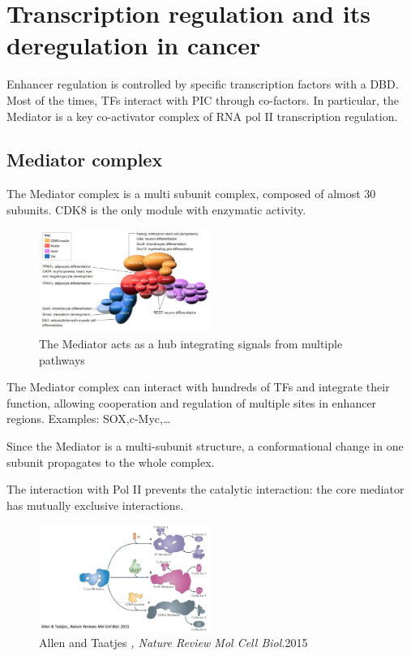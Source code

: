\graphicspath{{chapters/_resources/}}

\chapter{Transcription regulation and its deregulation in cancer}

Enhancer regulation is controlled by specific transcription factors with a DBD. Most of the times, TFs interact with PIC through co-factors. In particular, the Mediator is a key co-activator complex of RNA pol II transcription regulation.

\hypertarget{mediator-complex}{%
\section{Mediator complex}\label{mediator-complex}}

The Mediator complex is a multi subunit complex, composed of almost 30 subunits. CDK8 is the only module with enzymatic activity.

\begin{figure}
\centering
\includegraphics[width=0.5\textwidth]{../_resources/Screenshot_2022-10-07_at_10-47-50.png}
\caption{The Mediator acts as a hub integrating signals from multiple pathways}
\end{figure}

The Mediator complex can interact with hundreds of TFs and integrate their function, allowing cooperation and regulation of multiple sites in enhancer regions. Examples: SOX,c-Myc,\ldots{}

Since the Mediator is a multi-subunit structure, a conformational change in one subunit propagates to the whole complex.

The interaction with Pol II prevents the catalytic interaction: the core mediator has mutually exclusive interactions.

\begin{figure}
\centering
\includegraphics[width=0.5\textwidth]{../_resources/Screenshot_2022-10-07_at_10-50-30.png}
\caption{Allen and Taatjes \emph{, Nature Review Mol Cell Biol.}2015}
\end{figure}

